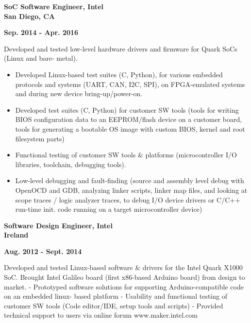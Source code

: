 \documentclass[6pt]{article}
\begin{document}
\hspace*{-\parindent}%
\begin{minipage}{20em}
{\bfseries SoC Software Engineer, Intel \\
San Diego, CA}
\end{minipage}
\hfill
\begin{minipage}{14em}
{
    \bfseries \hfill Sep. 2014 - Apr. 2016 \\

}
\end{minipage}
\break
\break
Developed and tested low-level hardware drivers and firmware for Quark SoCs (Linux and bare-
metal).
\begin{itemize}
    \item Developed Linux-based test suites (C, Python), for various embedded protocols and
          systems (UART, CAN, I2C, SPI), on FPGA-emulated systems and during new device
          bring-up/power-on.
    \item Developed test suites (C, Python) for customer SW tools (tools for writing BIOS
          configuration data to an EEPROM/flash device on a customer board, tools for
          generating a bootable OS image with custom BIOS, kernel and root filesystem parts)
    \item Functional testing of customer SW tools \& platforms (microcontroller I/O libraries, toolchain,
          debugging tools).
    \item Low-level debugging and fault-finding (source and assembly level debug with OpenOCD and GDB,
          analyzing linker scripts, linker map files, and looking at scope traces / logic analyzer traces, to
          debug I/O device drivers or C/C++ run-time init. code running on a target microcontroller device)
\end{itemize}

\hspace*{-\parindent}%
\begin{minipage}{20em}
{\bfseries Software Design Engineer, Intel \\
Ireland}
\end{minipage}
\hfill
\begin{minipage}{14em}
{
    \bfseries \hfill Aug. 2012 - Sept. 2014 \\

}
\end{minipage}
\break
\break
Developed and tested Linux-based software \& drivers for the Intel Quark X1000 SoC. Brought Intel
Galileo board (first x86-based Arduino board) from design to market.
- Prototyped software solutions for supporting Arduino-compatible code on an embedded linux-
based platform
- Usability and functional testing of customer SW tools (Code editor/IDE, setup tools and scripts)
- Provided technical support to users via online forum www.maker.intel.com
\end{document}
